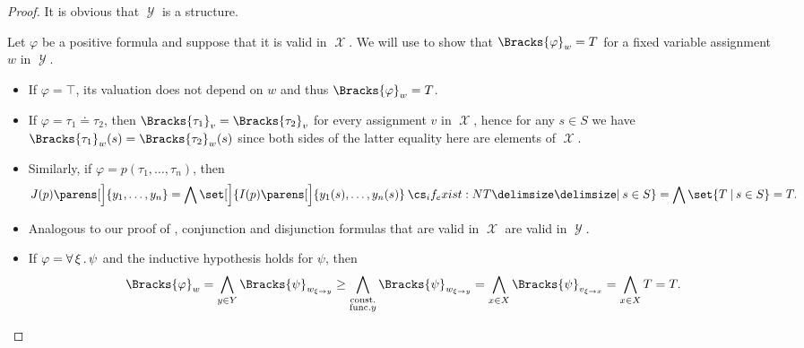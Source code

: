\begin{proof}
  It is obvious that \( \mscrY \) is a structure.

  Let \( \varphi \) be a positive formula and suppose that it is valid in \( \mscrX \). We will use  to show that \( \Bracks{\varphi}_w = T \) for a fixed variable assignment \( w \) in \( \mscrY \).
  \begin{itemize}
    \item If \( \varphi = \top \), its valuation does not depend on \( w \) and thus \( \Bracks{\varphi}_w = T \).

    \item If \( \varphi = \tau_1 \doteq \tau_2 \), then \( \Bracks{\tau_1}_v = \Bracks{\tau_2}_v \) for every assignment \( v \) in \( \mscrX \), hence for any \( s \in S \) we have \( \Bracks{\tau_1}_w(s) = \Bracks{\tau_2}_w(s) \) since both sides of the latter equality here are elements of \( \mscrX \).

    \item Similarly, if \( \varphi = p(\tau_1, \ldots, \tau_n) \), then
    \begin{equation*}
      J(p) \parens[\Big]{ y_1, \ldots, y_n }
      =
      \bigwedge \set[\Big]{ I(p) \parens[\Big]{ y_1(s), \ldots, y_n(s) } \given* s \in S }
      =
      \bigwedge \set{ T \given s \in S }
      =
      T.
    \end{equation*}

    \item Analogous to our proof of , conjunction and disjunction formulas that are valid in \( \mscrX \) are valid in \( \mscrY \).

    \item If \( \varphi = \forall \thinspace \xi \thinspace . \thinspace \psi \) and the inductive hypothesis holds for \( \psi \), then
    \begin{equation*}
      \Bracks{\varphi}_w
      =
      \bigwedge_{y \in Y} \Bracks{\psi}_{w_{\xi \to y}}
      \geq
      \bigwedge_{\substack{\T{const.} \\ \T{func.} y}} \Bracks{\psi}_{w_{\xi \to y}}
      =
      \bigwedge_{x \in X} \Bracks{\psi}_{v_{\xi \to x}}
      =
      \bigwedge_{x \in X} T
      =
      T.
    \end{equation*}
  \end{itemize}
\end{proof}

